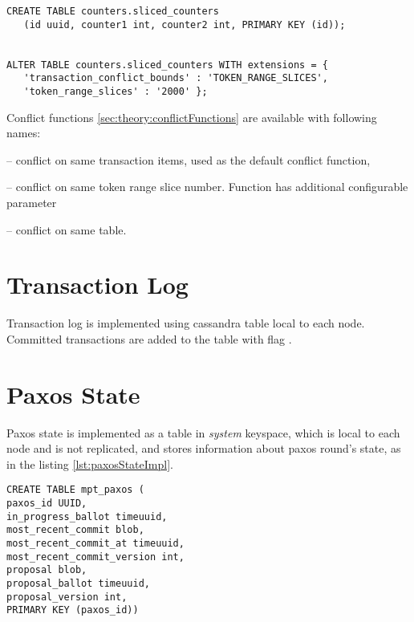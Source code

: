 \begin{lstlisting}[style=outcode,label={lst:configureConflictFunctions},caption={Configuring conflict function on Cassandra table}]
CREATE TABLE counters.sliced_counters 
   (id uuid, counter1 int, counter2 int, PRIMARY KEY (id));


ALTER TABLE counters.sliced_counters WITH extensions = { 
   'transaction_conflict_bounds' : 'TOKEN_RANGE_SLICES', 
   'token_range_slices' : '2000' };
\end{lstlisting}


Conflict functions \ref{sec:theory:conflictFunctions} are available with following names:
\begin{enumerate*}
\item {} -- conflict on same transaction items, used as the default conflict function,
\item {} -- conflict on same token range slice number. Function has additional configurable parameter 
\item {} -- conflict on same table.
\end{enumerate*}

\section{Transaction Log}
Transaction log is implemented using cassandra table local to each node. 
Committed transactions are added to the table with flag . 


\section{Paxos State}
Paxos state is implemented as a table in \emph{system} keyspace, which is local to each node and is not replicated, and stores information about paxos round's state, as in the listing \ref{lst:paxosStateImpl}.

\begin{lstlisting}[style=outcode,label={lst:paxosStateImpl},caption={Table definition for multi partition transactions paxos state}]
CREATE TABLE mpt_paxos (
paxos_id UUID,
in_progress_ballot timeuuid,
most_recent_commit blob,
most_recent_commit_at timeuuid,
most_recent_commit_version int,
proposal blob,
proposal_ballot timeuuid,
proposal_version int,
PRIMARY KEY (paxos_id))
\end{lstlisting}


